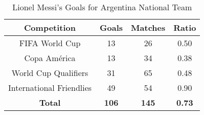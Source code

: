 \begin{table}[ht!]
    \centering
    \caption{Lionel Messi's Goals for Argentina National Team}
    \label{tab:messi_argentina_goals}
    \begin{tabular}{cccc}
    \hline
    \textbf{Competition} & \textbf{Goals} & \textbf{Matches} & \textbf{Ratio} \\ \hline
    FIFA World Cup & 13 & 26 & 0.50 \\
    Copa América & 13 & 34 & 0.38 \\
    World Cup Qualifiers & 31 & 65 & 0.48 \\
    International Friendlies & 49 & 54 & 0.90 \\ \hline
    \textbf{Total} & \textbf{106} & \textbf{145} & \textbf{0.73} \\ \hline
    \end{tabular}
\end{table}

